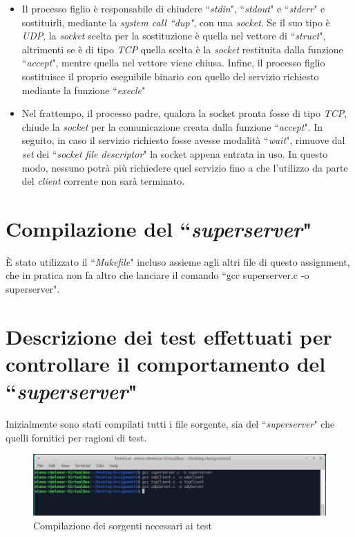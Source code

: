 \documentclass[a4paper, 12pt]{report}
\begin{document}
\begin{itemize}
    \item Il processo figlio è responsabile di chiudere ``\textit{stdin}", ``\textit{stdout}" e ``\textit{stderr}" e sostituirli, mediante la \textit{system call ``dup"},
    con una \textit{socket}. Se il suo tipo è \textit{UDP}, la \textit{socket} scelta per la sostituzione è quella nel vettore di ``\textit{struct}", altrimenti se è di tipo \textit{TCP}
    quella scelta è la \textit{socket} restituita dalla funzione ``\textit{accept}", mentre quella nel vettore viene chiusa. Infine, il processo figlio sostituisce il proprio
    eseguibile binario con quello del servizio richiesto mediante la funzione ``\textit{execle}"
    \item Nel frattempo, il processo padre, qualora la socket pronta fosse di tipo \textit{TCP}, chiude la \textit{socket} per la comunicazione creata dalla funzione ``\textit{accept}".
    In seguito, in caso il servizio richiesto fosse avesse modalità ``\textit{wait}", rimuove dal \textit{set} dei ``\textit{socket file descriptor}" la socket appena entrata in
    uso. In questo modo, nessuno potrà più richiedere quel servizio fino a che l'utilizzo da parte del \textit{client} corrente non sarà terminato. 
\end{itemize}

\section{Compilazione del ``\textit{superserver}"}

È stato utilizzato il ``\textit{Makefile}" incluso assieme agli altri file di questo assignment, che in pratica non fa altro che lanciare il comando ``gcc superserver.c
-o superserver".

\section{Descrizione dei test effettuati per controllare il comportamento del ``\textit{superserver}"}

Inizialmente sono stati compilati tutti i file sorgente, sia del ``\textit{superserver}" che quelli fornitici per ragioni di test.

\begin{figure}[H]
	\centering
	\includegraphics[width=\linewidth]{images/gcc.JPG}
	\caption{Compilazione dei sorgenti necessari ai test}
\end{figure}
\end{document}
